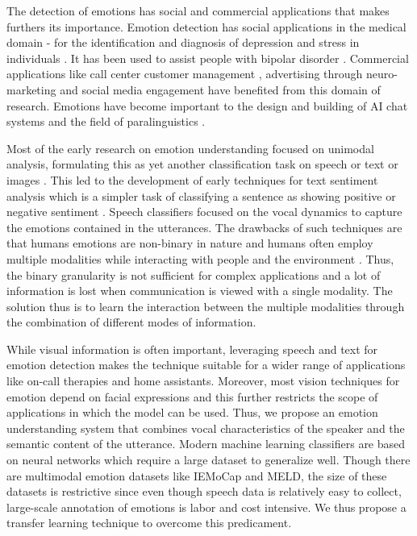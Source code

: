 \documentclass{article}
\begin{document}
The detection of emotions has social and commercial applications that makes furthers its importance. Emotion detection has social applications in the medical domain - for the identification and diagnosis of depression and stress in individuals \cite{depression} \cite{distress}. It has been used to assist people with bipolar disorder \cite{bipolar}. Commercial applications like call center customer management \cite{1704.08619}, advertising through neuro-marketing \cite{conv_atten_emo} and social media engagement \cite{compl_fusion} have benefited from this domain of research. Emotions have become important to the design and building of AI chat systems and the field of paralinguistics \cite{1810.04635}.

Most of the early research on emotion understanding focused on unimodal analysis, formulating this as yet another classification task on speech \cite{speech_1} \cite{speech_2} or text or images \cite{image_1}. This led to the development of early techniques for text sentiment analysis which is a simpler task of classifying a sentence as showing positive or negative sentiment \cite{text_sentiment}. Speech classifiers focused on the vocal dynamics to capture the emotions contained in the utterances. The drawbacks of such techniques are that humans emotions are non-binary in nature and humans often employ multiple modalities while interacting with people and the environment \cite{conv_atten_emo}. Thus, the binary granularity is not sufficient for complex applications and a lot of information is lost when communication is viewed with a single modality. The solution thus is to learn the interaction between the multiple modalities through the combination of different modes of information.

While visual information is often important, leveraging speech and text for emotion detection makes the technique suitable for a wider range of applications like on-call therapies and home assistants. Moreover, most vision techniques for emotion depend on facial expressions and this further restricts the scope of applications in which the model can be used. Thus, we propose an emotion understanding system that combines vocal characteristics of the speaker and the semantic content of the utterance. Modern machine learning classifiers are based on neural networks which require a large dataset to generalize well. Though there are multimodal emotion datasets like IEMoCap and MELD, the size of these datasets is restrictive since even though speech data is relatively easy to collect, large-scale annotation of emotions is labor and cost intensive. We thus propose a transfer learning technique to overcome this predicament.
\end{document}
